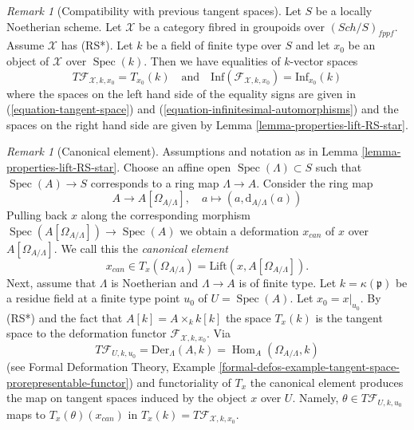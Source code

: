 \documentclass{stacks-project}
\theoremstyle{plain}
\theoremstyle{definition}
\theoremstyle{remark}
\newtheorem{remark}[subsection]{Remark}
\numberwithin{equation}{subsection}
\def\Spec{\mathop{\mathrm{Spec}}}
\def\Hom{\mathop{\mathrm{Hom}}\nolimits}
\def\Sch{\mathit{Sch}}
\begin{document}
\begin{remark}[Compatibility with previous tangent spaces]
\label{remark-compare-deformation-spaces}
Let $S$ be a locally Noetherian scheme. Let $\mathcal{X}$ be a category fibred
in groupoids over $(\Sch/S)_{fppf}$. Assume $\mathcal{X}$ has (RS*).
Let $k$ be a field of finite type over $S$ and let $x_0$ be an object of
$\mathcal{X}$ over $\Spec(k)$. Then we have equalities of
$k$-vector spaces
$$
T\mathcal{F}_{\mathcal{X}, k, x_0} = T_{x_0}(k)
\quad\text{and}\quad
\text{Inf}(\mathcal{F}_{\mathcal{X}, k, x_0}) =
\text{Inf}_{x_0}(k)
$$
where the spaces on the left hand side of the equality signs are
given in (\ref{equation-tangent-space}) and
(\ref{equation-infinitesimal-automorphisms})
and the spaces on the right hand side are given by
Lemma \ref{lemma-properties-lift-RS-star}.
\end{remark}

\begin{remark}[Canonical element]
\label{remark-canonical-element}
Assumptions and notation as in Lemma \ref{lemma-properties-lift-RS-star}.
Choose an affine open $\Spec(\Lambda) \subset S$ such that $\Spec(A) \to S$
corresponds to a ring map $\Lambda \to A$. Consider the ring map
$$
A \longrightarrow A[\Omega_{A/\Lambda}],
\quad
a \longmapsto (a, \text{d}_{A/\Lambda}(a))
$$
Pulling back $x$ along the corresponding morphism
$\Spec(A[\Omega_{A/\Lambda}]) \to \Spec(A)$ we obtain a
deformation $x_{can}$ of $x$ over $A[\Omega_{A/\Lambda}]$. We call this
the {\it canonical element}
$$
x_{can} \in T_x(\Omega_{A/\Lambda}) = \text{Lift}(x, A[\Omega_{A/\Lambda}]).
$$
Next, assume that $\Lambda$ is Noetherian and $\Lambda \to A$
is of finite type. Let
$k = \kappa(\mathfrak p)$ be a residue field at a finite type point $u_0$
of $U = \Spec(A)$. Let $x_0 = x|_{u_0}$. By (RS*) and the fact that
$A[k] = A \times_k k[k]$ the space $T_x(k)$ is the tangent space to the
deformation functor $\mathcal{F}_{\mathcal{X}, k, x_0}$. Via
$$
T\mathcal{F}_{U, k, u_0} =
\text{Der}_\Lambda(A, k) = \Hom_A(\Omega_{A/\Lambda}, k)
$$
(see Formal Deformation Theory, Example
\ref{formal-defos-example-tangent-space-prorepresentable-functor})
and functoriality of $T_x$ the canonical element produces the map
on tangent spaces induced by the object $x$ over $U$. Namely,
$\theta \in T\mathcal{F}_{U, k, u_0}$ maps to $T_x(\theta)(x_{can})$
in $T_x(k) = T\mathcal{F}_{\mathcal{X}, k, x_0}$.
\end{remark}
\end{document}
